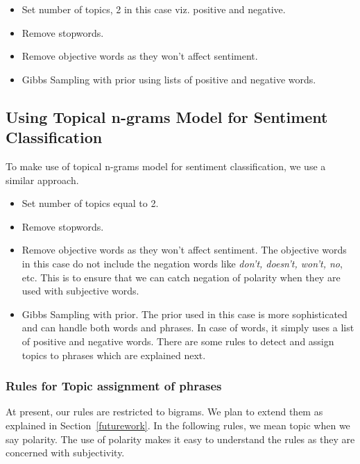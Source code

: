 \documentclass[11pt]{article}
\begin{document}
\begin{itemize}
 \itemsep0em
 \item Set number of topics, 2 in this case viz. positive and negative.
 \item Remove stopwords.
 \item Remove objective words as they won't affect sentiment.
 \item Gibbs Sampling with prior using lists of positive and negative words.
\end{itemize}

\subsection{Using Topical n-grams Model for Sentiment Classification}

To make use of topical n-grams model for sentiment classification, we use a similar approach.

\begin{itemize}
 \itemsep0em
 \item Set number of topics equal to 2.
 \item Remove stopwords.
 \item Remove objective words as they won't affect sentiment. The objective words in this
 case do not include the negation words like \textit{don't, doesn't, won't, no}, etc. This is to
 ensure that we can catch negation of polarity when they are used with subjective words.
 \item Gibbs Sampling with prior. The prior used in this case is more sophisticated and can
 handle both words and phrases. In case of words, it simply uses a list of positive and negative
 words. There are some rules to detect and assign topics to phrases which are explained next.
\end{itemize}

\subsubsection*{Rules for Topic assignment of phrases}

At present, our rules are restricted to bigrams. We plan to extend them as explained in Section~\ref{futurework}.
In the following rules, we mean topic when we say polarity. The use of polarity makes it easy to understand
the rules as they are concerned with subjectivity.
\end{document}
